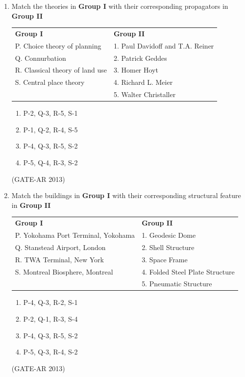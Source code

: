 \documentclass[a4paper,10pt]{article}
\begin{document}
\begin{enumerate}
    \item Match the theories in \textbf{Group I} with their corresponding propagators in \textbf{Group II} \\
    \begin{tabular}{ l l }
	\textbf{Group I} & \textbf{Group II} \\
	P. Choice theory of planning & 1. Paul Davidoff and T.A. Reiner \\
	Q. Connurbation & 2. Patrick Geddes \\
	R. Classical theory of land use & 3. Homer Hoyt \\
	S. Central place theory & 4. Richard L. Meier \\
	& 5. Walter Christaller \\
	\end{tabular}
	\begin{multicols}{2}
	\begin{enumerate}
        \item P-2, Q-3, R-5, S-1
        \item P-1, Q-2, R-4, S-5
        \item P-4, Q-3, R-5, S-2
        \item P-5, Q-4, R-3, S-2
    \end{enumerate}
	\end{multicols}
    \hfill (GATE-AR 2013)

    \item Match the buildings in \textbf{Group I} with their corresponding structural feature in \textbf{Group II} \\
    \begin{tabular}{ l l }
	\textbf{Group I} & \textbf{Group II} \\
	P. Yokohama Port Terminal, Yokohama & 1. Geodesic Dome \\
	Q. Stanstead Airport, London & 2. Shell Structure \\
	R. TWA Terminal, New York & 3. Space Frame \\
	S. Montreal Biosphere, Montreal & 4. Folded Steel Plate Structure \\
	& 5. Pneumatic Structure \\
	\end{tabular}
	\begin{multicols}{2}
	\begin{enumerate}
        \item P-4, Q-3, R-2, S-1
        \item P-2, Q-1, R-3, S-4
        \item P-4, Q-3, R-5, S-2
        \item P-5, Q-3, R-4, S-2
    \end{enumerate}
	\end{multicols}
    \hfill (GATE-AR 2013)


\end{enumerate}
\end{document}
